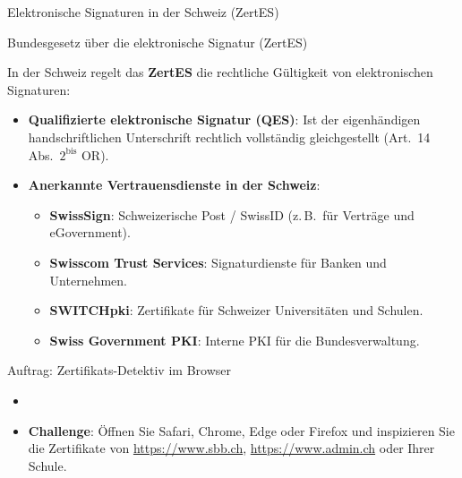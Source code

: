 \begin{frame}{Elektronische Signaturen in der Schweiz (ZertES)}
	\begin{block}{Bundesgesetz über die elektronische Signatur (\acrshort{ZertES})}
		{\small
		In der Schweiz regelt das \textbf{ZertES} die rechtliche Gültigkeit von elektronischen Signaturen:
		\begin{itemize}[<+->]
			\item \textbf{Qualifizierte elektronische Signatur (QES)}:
			      Ist der eigenhändigen handschriftlichen Unterschrift rechtlich vollständig gleichgestellt (Art.~14 Abs.~$2^{\text{bis}}$ OR).
			\item \textbf{Anerkannte Vertrauensdienste in der Schweiz}:
			      \begin{itemize}
				      \item \textbf{SwissSign}: Schweizerische Post / SwissID (z.\,B.\ für Verträge und eGovernment).
				      \item \textbf{Swisscom Trust Services}: Signaturdienste für Banken und Unternehmen.
				      \item \textbf{SWITCHpki}: Zertifikate für Schweizer Universitäten und Schulen.
				      \item \textbf{Swiss Government PKI}: Interne PKI für die Bundesverwaltung.
			      \end{itemize}
		\end{itemize}
		}
	\end{block}
\end{frame}

\begin{frame}{Auftrag: Zertifikats-Detektiv im Browser}
	\begin{itemize}
		\item {}
		\item \textbf{Challenge}: Öffnen Sie Safari, Chrome, Edge oder Firefox und inspizieren Sie die Zertifikate von \url{https://www.sbb.ch}, \url{https://www.admin.ch} oder Ihrer Schule.
	\end{itemize}
\end{frame}
